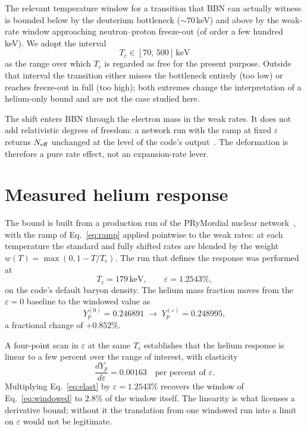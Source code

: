 \documentclass[aps,prd,twocolumn,superscriptaddress,nofootinbib,10pt]{revtex4-2}
\begin{document}
The relevant temperature window for a transition that BBN can actually witness is bounded below
by the deuterium bottleneck ($\sim\!70\,$keV) and above by the weak-rate window approaching
neutron--proton freeze-out (of order a few hundred keV). We adopt the interval
%
\begin{equation}
  T_c \in [70,\,500]\,\mathrm{keV}
  \label{eq:window}
\end{equation}
%
as the range over which $T_c$ is regarded as free for the present purpose. Outside that interval
the transition either misses the bottleneck entirely (too low) or reaches freeze-out in full (too
high); both extremes change the interpretation of a helium-only bound and are not the case
studied here.

The shift enters BBN through the electron mass in the weak rates. It does not add relativistic
degrees of freedom: a network run with the ramp at fixed $\varepsilon$ returns $N_{\rm eff}$
unchanged at the level of the code's output~\cite{PRyMordial2023}. The deformation is therefore a
pure rate effect, not an expansion-rate lever.

\section{Measured helium response}\label{sec:helium}

The bound is built from a production run of the PRyMordial nuclear
network~\cite{PRyMordial2023}, with the ramp of Eq.~\eqref{eq:ramp} applied pointwise to the weak
rates: at each temperature the standard and fully shifted rates are blended by the weight
$w(T)=\max(0,1-T/T_c)$. The run that defines the response was performed at
%
\begin{equation}
  T_c = 179\,\mathrm{keV},\qquad \varepsilon = 1.2543\%,
  \label{eq:run}
\end{equation}
%
on the code's default baryon density. The helium mass fraction moves from the $\varepsilon=0$
baseline to the windowed value as
%
\begin{equation}
  Y_p^{(0)} = 0.246891
  \;\longrightarrow\;
  Y_p^{(\varepsilon)} = 0.248995,
  \label{eq:windowed}
\end{equation}
%
a fractional change of $+0.852\%$.

A four-point scan in $\varepsilon$ at the same $T_c$ establishes that the helium response is
linear to a few percent over the range of interest, with elasticity
%
\begin{equation}
  \frac{d Y_p}{d\varepsilon}
  = 0.00163
  \quad\text{per percent of $\varepsilon$}.
  \label{eq:elast}
\end{equation}
%
Multiplying Eq.~\eqref{eq:elast} by $\varepsilon=1.2543\%$ recovers the window of
Eq.~\eqref{eq:windowed} to $2.8\%$ of the window itself. The linearity is what licenses a
derivative bound; without it the translation from one windowed run into a limit on $\varepsilon$
would not be legitimate.
\end{document}
